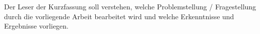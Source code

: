 Der Leser der Kurzfassung soll verstehen, welche Problemstellung / Fragestellung durch die vorliegende Arbeit bearbeitet wird und welche 
Erkenntnisse und Ergebnisse vorliegen.
